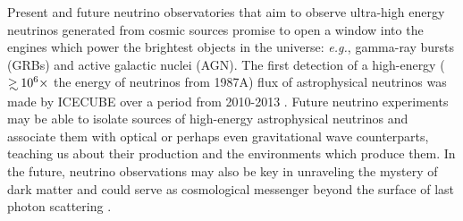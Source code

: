 Present and future neutrino observatories that aim to observe ultra-high
energy neutrinos generated from cosmic sources promise to open a window into
the engines which power the brightest objects in the universe: \textit{e.g.},
gamma-ray bursts (GRBs) and active galactic nuclei (AGN). The first detection
of a high-energy ($\gsim10^6 \times$ the energy of neutrinos from 1987A) flux
of astrophysical neutrinos was made by ICECUBE over a period from
2010-2013 \citep{ICECUBE:2013:detection}. Future neutrino experiments may be
able to isolate sources of high-energy astrophysical neutrinos and associate
them with optical or perhaps even gravitational wave counterparts, teaching us
about their production and the environments which produce them. In the future,
neutrino observations may also be key in unraveling the mystery of dark matter
and could serve as cosmological messenger beyond the surface of last photon
scattering \citep{HEneutrino_Rev:2011}.

















